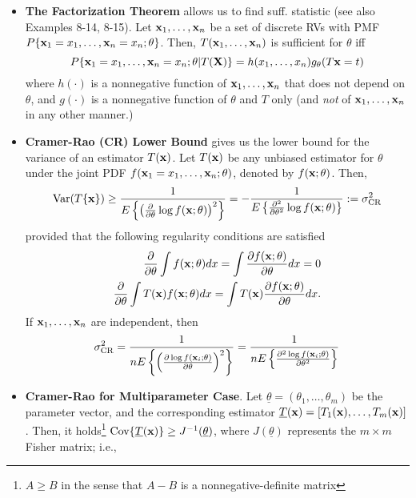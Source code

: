 \documentclass[a4paper]{book}
\begin{document}
\begin{itemize}
\item \textbf{The Factorization Theorem} allows us to find suff. statistic (see also Examples 8-14, 8-15). Let $\mathbf{x}_1,\hdots,\mathbf{x}_n$ be a set of discrete RVs with PMF $P\{\mathbf{x}_1=x_1,\hdots,\mathbf{x}_n=x_n; \theta \}$. Then, $T(\mathbf{x}_1, \hdots, \mathbf{x}_n)$ is sufficient for $\theta$ iff 
\begin{equation}
P\{\mathbf{x}_1=x_1,\hdots,\mathbf{x}_n=x_n; \theta | T(\mathbf{X})\}=h(x_1,\dots,x_n)g_\theta(T\mathbf{x}=t)
\end{equation}	
where $h(\cdot)$ is a nonnegative function of $\mathbf{x}_1, \hdots, \mathbf{x}_n$ that does not depend on $\theta$, and $g(\cdot)$ is a nonnegative function of $\theta$ and $T$ only (and \textit{not} of $\mathbf{x}_1, \hdots, \mathbf{x}_n$ in any other manner.)
\item \textbf{Cramer-Rao (CR) Lower Bound} gives us the lower bound for the variance of an estimator $T(\mathbf{x})$. Let $T(\mathbf{x})$ be any unbiased estimator for $\theta$ under the joint PDF $f(\mathbf{x}_1=x_1,\hdots,\mathbf{x}_n; \theta)$, denoted by $f(\mathbf{x};\theta)$. Then,
\begin{equation}
\text{Var}(T\{\mathbf{x}\}) \ge \frac{1}{E\left\{ \left( \frac{\partial}{\partial \theta}\log f(\mathbf{x}; \theta) \right)^2 \right\}} = -\frac{1}{E\left\{ \frac{\partial^2}{\partial \theta^2}\log f(\mathbf{x}; \theta)  \right\}} := \sigma_{\text{CR}}^2
\end{equation}
provided that the following regularity conditions are satisfied
\begin{align}
\frac{\partial}{\partial \theta} \int f(\mathbf{x}; \theta) dx = \int \frac{\partial f(\mathbf{x};\theta)}{\partial \theta} dx = 0 \\
\frac{\partial}{\partial \theta} \int T(\mathbf{x}) f(\mathbf{x};\theta)dx = \int T(\mathbf{x}) \frac{\partial f(\mathbf{x;\theta})}{\partial \theta} dx.
\end{align}
If $\mathbf{x}_1, \hdots, \mathbf{x}_n$ are independent, then 
\begin{equation}
\sigma_{\text{CR}}^2 = \frac{1}{n E \left\{  \left( \frac{\partial \log f(\mathbf{x}_i; \theta) }{\partial \theta} \right)^2   \right\}    } = \frac{1}{n E \left\{  \frac{\partial^2 \log f(\mathbf{x}_i; \theta) }{\partial \theta^2}    \right\}    }
\end{equation}
\item \textbf{Cramer-Rao for Multiparameter Case}. Let $\underline{\theta} = (\theta_1, \hdots, \theta_m)$ be the parameter vector, and the corresponding estimator $\underline{T}(\mathbf{x})=[T_1(\mathbf{x}), \hdots, T_m(\mathbf{x})]$. Then, it holds\footnote{$A\ge B$ in the sense that $A-B$ is a nonnegative-definite matrix} $\text{Cov}\{\underline{T}(\mathbf{x})\}\ge J^{-1}(\underline{\theta})$, where $J(\underline{\theta})$ represents the $m\times m$ Fisher matrix; i.e., 

\end{itemize}
\end{document}
